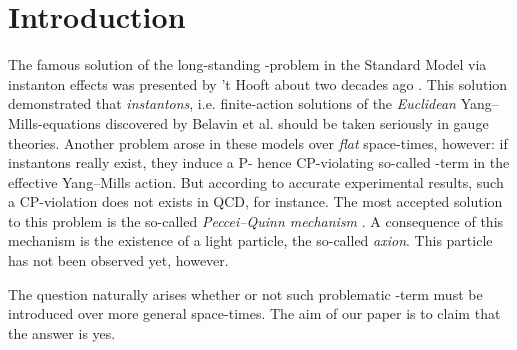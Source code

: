 \documentclass[a4paper,12pt,draft]{article}
\begin{document}
\section{Introduction}
The famous solution of the long-standing \coordHE{}-problem in the Standard 
Model via instanton effects was presented by 't Hooft about two
decades ago \cite{tho}. This solution demonstrated that {\it instantons},
i.e. finite-action solutions of the {\it Euclidean} Yang--Mills-equations
discovered by Belavin et al. \cite{bpst} should be taken seriously
in gauge theories. Another problem arose in these models over 
{\it flat} space-times, however: if instantons really exist, they induce a
P- hence CP-violating so-called \myHighlight{$\theta$}\coordHE{}-term in the effective Yang--Mills
action. But according to accurate experimental results, such a
CP-violation does not exists in QCD, for instance. The most accepted
solution to this  problem is the so-called {\it Peccei--Quinn mechanism}
\cite{pec}. A consequence of this mechanism is the existence of a light
particle, the so-called {\it axion}. This particle has not been observed
yet, however.

The question naturally arises whether or not such problematic
\myHighlight{$\theta$}\coordHE{}-term must be introduced over more general space-times. The aim of
our paper is to claim that the answer is yes.
 
\end{document}
